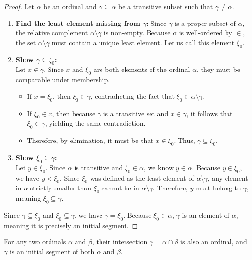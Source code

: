 \documentclass[11pt]{article}
\begin{document}
\begin{proof}
Let $\alpha$ be an ordinal and $\gamma \subseteq \alpha$ be a transitive subset such that $\gamma \neq \alpha$.
\begin{enumerate}
\item \textbf{Find the least element missing from $\gamma$:} Since $\gamma$ is a proper subset of $\alpha$, the relative complement $\alpha \setminus \gamma$ is non-empty. Because $\alpha$ is well-ordered by $\in$, the set $\alpha \setminus \gamma$ must contain a unique least element. Let us call this element $\xi_0$.
\item \textbf{Show $\gamma \subseteq \xi_0$:} \\
Let $x \in \gamma$. Since $x$ and $\xi_0$ are both elements of the ordinal $\alpha$, they must be comparable under membership. 
\begin{itemize}
    \item If $x = \xi_0$, then $\xi_0 \in \gamma$, contradicting the fact that $\xi_0 \in \alpha \setminus \gamma$.
    \item If $\xi_0 \in x$, then because $\gamma$ is a transitive set and $x \in \gamma$, it follows that $\xi_0 \in \gamma$, yielding the same contradiction.
    \item Therefore, by elimination, it must be that $x \in \xi_0$. Thus, $\gamma \subseteq \xi_0$.
\end{itemize}
\item \textbf{Show $\xi_0 \subseteq \gamma$:} \\
Let $y \in \xi_0$. Since $\alpha$ is transitive and $\xi_0 \in \alpha$, we know $y \in \alpha$. Because $y \in \xi_0$, we have $y < \xi_0$. Since $\xi_0$ was defined as the least element of $\alpha \setminus \gamma$, any element in $\alpha$ strictly smaller than $\xi_0$ cannot be in $\alpha \setminus \gamma$. Therefore, $y$ must belong to $\gamma$, meaning $\xi_0 \subseteq \gamma$.
\end{enumerate}
Since $\gamma \subseteq \xi_0$ and $\xi_0 \subseteq \gamma$, we have $\gamma = \xi_0$. Because $\xi_0 \in \alpha$, $\gamma$ is an element of $\alpha$, meaning it is precisely an initial segment.
\end{proof}

\begin{lemma}
For any two ordinals $\alpha$ and $\beta$, their intersection $\gamma = \alpha \cap \beta$ is also an ordinal, and $\gamma$ is an initial segment of both $\alpha$ and $\beta$.
\end{lemma}
\end{document}
